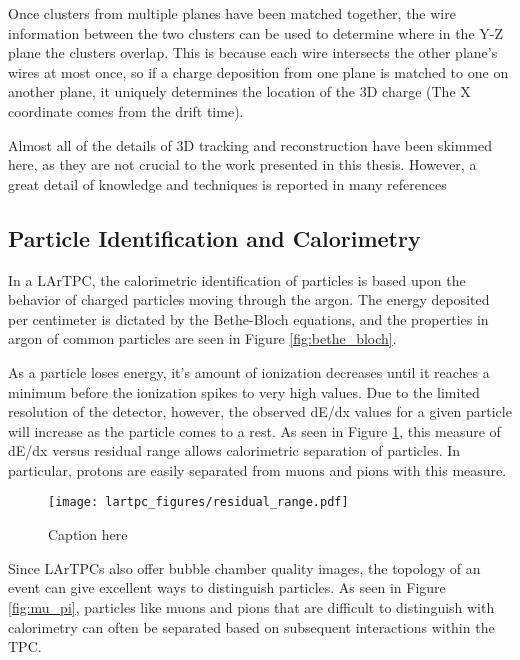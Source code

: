 Once clusters from multiple planes have been matched together, the wire information between the two clusters can be used to determine where in the Y-Z plane the clusters overlap.  This is because each wire intersects the other plane's wires at most once, so if a charge deposition from one plane is matched to one on another plane, it uniquely determines the location of the 3D charge (The X coordinate comes from the drift time).

Almost all of the details of 3D tracking and reconstruction have been skimmed here, as they are not crucial to the work presented in this thesis.  However, a great detail of knowledge and techniques is reported in many references \cite{reco:tracking_ref} \cite{reco:other_refs.}

\subsection{Particle Identification and Calorimetry}

In a LArTPC, the calorimetric identification of particles is based upon the behavior of charged particles moving through the argon.  The energy deposited per centimeter is dictated by the Bethe-Bloch equations, and the properties in argon of common particles are seen in Figure \ref{fig:bethe_bloch}.

As a particle loses energy, it's amount of ionization decreases until it reaches a minimum before the ionization spikes to very high values.  Due to the limited resolution of the detector, however, the observed dE/dx values for a given particle will increase as the particle comes to a rest.  As seen in Figure \ref{fig:residual_range}, this measure of dE/dx versus residual range allows calorimetric separation of particles.  In particular, protons are easily separated from muons and pions with this measure.

\begin{figure}[tb]
  \centering
  \texttt{[image: lartpc\_figures/residual\_range.pdf]}
  \caption{Caption here}
  \label{fig:residual_range}
\end{figure}

Since LArTPCs also offer bubble chamber quality images, the topology of an event can give excellent ways to distinguish particles.  As seen in Figure \ref{fig:mu_pi}, particles like muons and pions that are difficult to distinguish with calorimetry can often be separated based on subsequent interactions within the TPC.



